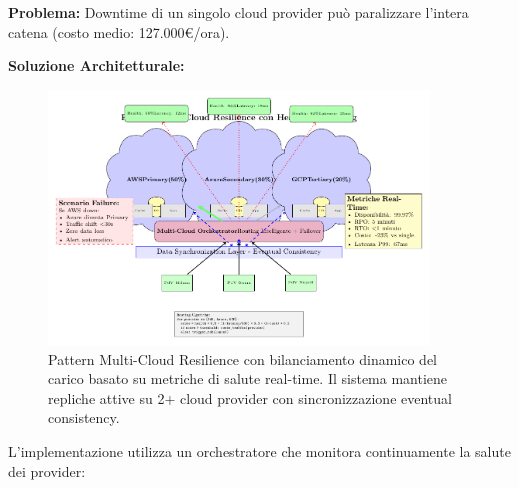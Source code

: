 \textbf{Problema:}
Downtime di un singolo cloud provider può paralizzare l'intera catena (costo medio: 127.000€/ora)\autocite{Uptime2024}.

\textbf{Soluzione Architetturale:}

\begin{figure}[htbp]
\centering
\includegraphics[width=0.9\textwidth]{thesis_figures/cap3/multicloud_pattern.pdf}
\caption{Pattern Multi-Cloud Resilience con bilanciamento dinamico del carico basato su metriche di salute real-time. Il sistema mantiene repliche attive su 2+ cloud provider con sincronizzazione eventual consistency.}
\label{fig:multicloud_pattern}
\end{figure}

L'implementazione utilizza un orchestratore che monitora continuamente la salute dei provider:

